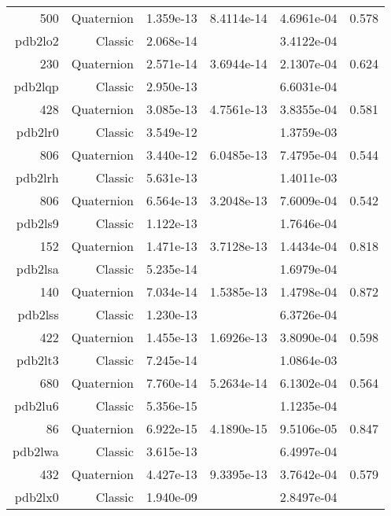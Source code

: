 \begin{xltabular}{\textwidth}{r|rS[table-format=1.3e+2]S[table-format=1.4e+2]S[table-format=1.4e+2]S[table-format=-1.3]}
500 & Quaternion & 1.359e-13 & 8.4114e-14 & 4.6961e-04 & 0.578\\  \addlinespace
{\color{red} pdb2lo2 } & Classic & 2.068e-14 &  & 3.4122e-04 & \\
230 & Quaternion & 2.571e-14 & 3.6944e-14 & 2.1307e-04 & 0.624\\  \addlinespace
{\color{red} pdb2lqp } & Classic & 2.950e-13 &  & 6.6031e-04 & \\
428 & Quaternion & 3.085e-13 & 4.7561e-13 & 3.8355e-04 & 0.581\\  \addlinespace
{\color{red} pdb2lr0 } & Classic & 3.549e-12 &  & 1.3759e-03 & \\
806 & Quaternion & 3.440e-12 & 6.0485e-13 & 7.4795e-04 & 0.544\\  \addlinespace
{\color{red} pdb2lrh } & Classic & 5.631e-13 &  & 1.4011e-03 & \\
806 & Quaternion & 6.564e-13 & 3.2048e-13 & 7.6009e-04 & 0.542\\  \addlinespace
{\color{red} pdb2ls9 } & Classic & 1.122e-13 &  & 1.7646e-04 & \\
152 & Quaternion & 1.471e-13 & 3.7128e-13 & 1.4434e-04 & 0.818\\  \addlinespace
{\color{red} pdb2lsa } & Classic & 5.235e-14 &  & 1.6979e-04 & \\
140 & Quaternion & 7.034e-14 & 1.5385e-13 & 1.4798e-04 & 0.872\\  \addlinespace
{\color{red} pdb2lss } & Classic & 1.230e-13 &  & 6.3726e-04 & \\
422 & Quaternion & 1.455e-13 & 1.6926e-13 & 3.8090e-04 & 0.598\\  \addlinespace
{\color{red} pdb2lt3 } & Classic & 7.245e-14 &  & 1.0864e-03 & \\
680 & Quaternion & 7.760e-14 & 5.2634e-14 & 6.1302e-04 & 0.564\\  \addlinespace
{\color{red} pdb2lu6 } & Classic & 5.356e-15 &  & 1.1235e-04 & \\
86 & Quaternion & 6.922e-15 & 4.1890e-15 & 9.5106e-05 & 0.847\\  \addlinespace
{\color{red} pdb2lwa } & Classic & 3.615e-13 &  & 6.4997e-04 & \\
432 & Quaternion & 4.427e-13 & 9.3395e-13 & 3.7642e-04 & 0.579\\  \addlinespace
{\color{red} pdb2lx0 } & Classic & 1.940e-09 &  & 2.8497e-04 & \\

\end{xltabular}
